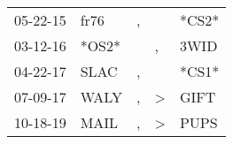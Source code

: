 \begin{supertabular}{lllll}
 05-22-15 &   fr76 &  , &               &  *CS2* \\
 03-12-16 &  *OS2* &    &             , &   3WID \\
 04-22-17 &   SLAC &  , &               &  *CS1* \\
 07-09-17 &   WALY &  , &  \textgreater &   GIFT \\
 10-18-19 &   MAIL &  , &  \textgreater &   PUPS \\
\end{supertabular}
